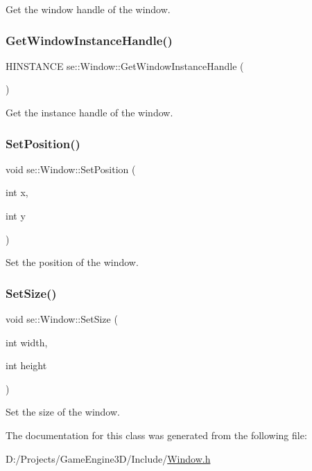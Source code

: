 Get the window handle of the window. \mbox{\label{classse_1_1_window_a7ae4b774d8f47d6abb0462e2240e8cae}} 
\subsubsection{\texorpdfstring{Get\+Window\+Instance\+Handle()}{GetWindowInstanceHandle()}}
{\footnotesize\ttfamily H\+I\+N\+S\+T\+A\+N\+CE se\+::\+Window\+::\+Get\+Window\+Instance\+Handle (\begin{DoxyParamCaption}{ }\end{DoxyParamCaption})}

Get the instance handle of the window. \mbox{\label{classse_1_1_window_ad2fc9ceb2c543762bbc863fe6df637a1}} 
\subsubsection{\texorpdfstring{Set\+Position()}{SetPosition()}}
{\footnotesize\ttfamily void se\+::\+Window\+::\+Set\+Position (\begin{DoxyParamCaption}\item[{int}]{x,  }\item[{int}]{y }\end{DoxyParamCaption})}

Set the position of the window. \mbox{\label{classse_1_1_window_a7c66652dccf4764cfa6e4af6fab684b8}} 
\subsubsection{\texorpdfstring{Set\+Size()}{SetSize()}}
{\footnotesize\ttfamily void se\+::\+Window\+::\+Set\+Size (\begin{DoxyParamCaption}\item[{int}]{width,  }\item[{int}]{height }\end{DoxyParamCaption})}

Set the size of the window. 

The documentation for this class was generated from the following file\+:\begin{DoxyCompactItemize}
\item 
D\+:/\+Projects/\+Game\+Engine3\+D/\+Include/\mbox{\hyperlink{_window_8h}{Window.\+h}}\end{DoxyCompactItemize}
